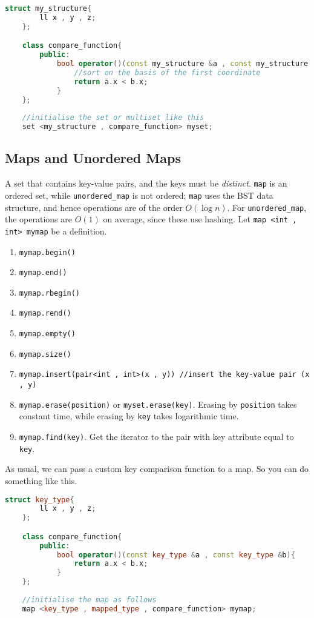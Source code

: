 \documentclass[12pt,a4paper]{amsart}
\numberwithin{equation}{section}
\theoremstyle{definition}
\begin{document}
\begin{lstlisting}[language=C++]
    struct my_structure{
        ll x , y , z;
    };

    class compare_function{
        public:
            bool operator()(const my_structure &a , const my_structure &b){
                //sort on the basis of the first coordinate
                return a.x < b.x;
            }
    };
    
    //initialise the set or multiset like this 
    set <my_structure , compare_function> myset;
\end{lstlisting}

\subsection{Maps and Unordered Maps} A set that contains key-value pairs, and the keys must be \textit{distinct}. \verb|map| is an ordered set, while \verb|unordered_map| is not ordered; \verb|map| uses the BST data structure, and hence operations are of the order $O(\log n)$. For \verb|unordered_map|, the operations are $O(1)$ on average, since these use hashing. Let \verb|map <int , int> mymap| be a definition. 
\begin{enumerate}
    \item \verb|mymap.begin()|
    \item \verb|mymap.end()|
    \item \verb|mymap.rbegin()|
    \item \verb|mymap.rend()|
    \item \verb|mymap.empty()|
    \item \verb|mymap.size()|
    \item \verb|mymap.insert(pair<int , int>(x , y)) //insert the key-value pair (x , y)|
    \item \verb|mymap.erase(position)| or \verb|myset.erase(key)|. Erasing by \verb|position| takes constant time, while erasing by \verb|key| takes logarithmic time.
    \item \verb|mymap.find(key)|. Get the iterator to the pair with key attribute equal to \verb|key|.
\end{enumerate}
\noindent As usual, we can pass a custom key comparison function to a map. So you can do something like this. 

\begin{lstlisting}[language=C++]
    struct key_type{
        ll x , y , z;
    };

    class compare_function{
        public:
            bool operator()(const key_type &a , const key_type &b){
                return a.x < b.x;
            }
    };
    
    //initialise the map as follows 
    map <key_type , mapped_type , compare_function> mymap;
\end{lstlisting}
\end{document}
